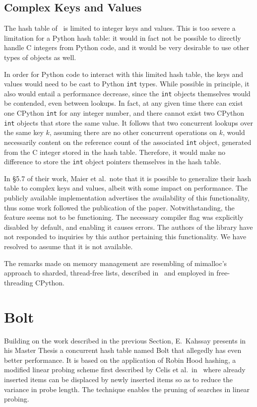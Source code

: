 \subsection{Complex Keys and Values}\label{subsec:maier-complex-keys-and-values}

The hash table of~\cite{maier} is limited to integer keys and values.
This is too severe a limitation for a Python hash table: it would in fact not be possible to directly handle C integers from Python code, and it would be very desirable to use other types of objects as well.

In order for Python code to interact with this limited hash table, the keys and values would need to be cast to Python \texttt{int} types.
While possible in principle, it also would entail a performance decrease, since the \texttt{int} objects themselves would be contended, even between lookups.
In fact, at any given time there can exist one CPython \texttt{int} for any integer number, and there cannot exist two CPython \texttt{int} objects that store the same value.
It follows that two concurrent lookups over the same key $k$, assuming there are no other concurrent operations on $k$, would necessarily content on the reference count of the associated \texttt{int} object, generated from the C integer stored in the hash table.
Therefore, it would make no difference to store the \texttt{int} object pointers themselves in the hash table.

In \S5.7 of their work, Maier et al.\ note that it is possible to generalize their hash table to complex keys and values, albeit with some impact on performance.
The publicly available implementation advertises the availability of this functionality, thus some work followed the publication of the paper.
Notwithstanding, the feature seems not to be functioning.
The necessary compiler flag was explicitly disabled by default, and enabling it causes errors.
The authors of the library have not responded to inquiries by this author pertaining this functionality.
We have resolved to assume that it is not available.

The remarks made on memory management are resembling of mimalloc's approach to sharded, thread-free lists, described in~\cite{mimalloc} and employed in free-threading CPython.


\section{Bolt}\label{sec:bolt}

Building on the work described in the previous Section, E.\ Kahssay presents in his Master Thesis a concurrent hash table named Bolt that allegedly has even better performance.
It is based on the application of Robin Hood hashing, a modified linear probing scheme first described by Celis et al.\ in~\cite{robin-hood} where already inserted items can be displaced by newly inserted items so as to reduce the variance in probe length.
The technique enables the pruning of searches in linear probing.

